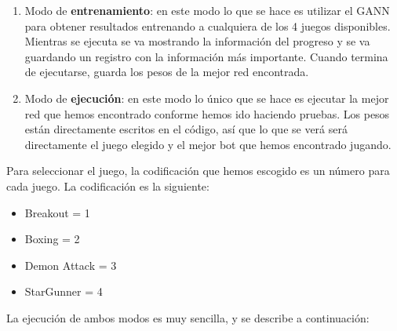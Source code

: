 \begin{enumerate}
    \item Modo de \textbf{entrenamiento}: en este modo lo que se hace es utilizar el GANN para obtener resultados entrenando a cualquiera de los 4 juegos disponibles. Mientras se ejecuta se va mostrando la información del progreso y se va guardando un registro con la información más importante. Cuando termina de ejecutarse, guarda los pesos de la mejor red encontrada.
    \item Modo de \textbf{ejecución}: en este modo lo único que se hace es ejecutar la mejor red que hemos encontrado conforme hemos ido haciendo pruebas. Los pesos están directamente escritos en el código, así que lo que se verá será directamente el juego elegido y el mejor bot que hemos encontrado jugando.
\end{enumerate}

Para seleccionar el juego, la codificación que hemos escogido es un número para cada juego. La codificación es la siguiente:

\begin{itemize}
    \item Breakout = 1
    \item Boxing = 2
    \item Demon Attack = 3
    \item StarGunner = 4
\end{itemize}

La ejecución de ambos modos es muy sencilla, y se describe a continuación:

